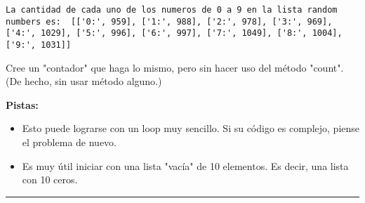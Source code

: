 \documentclass[11pt]{article}
\providecommand{\tightlist}{%
      \setlength{\itemsep}{0pt}\setlength{\parskip}{0pt}}
\begin{document}
    \begin{Verbatim}[commandchars=\\\{\}]
La cantidad de cada uno de los numeros de 0 a 9 en la lista random numbers es:  [['0:', 959], ['1:', 988], ['2:', 978], ['3:', 969], ['4:', 1029], ['5:', 996], ['6:', 997], ['7:', 1049], ['8:', 1004], ['9:', 1031]]

    \end{Verbatim}

    Cree un "contador" que haga lo mismo, pero sin hacer uso del método
"count". (De hecho, sin usar método alguno.)

    \textbf{Pistas:}

\begin{itemize}
\tightlist
\item
  Esto puede lograrse con un loop muy sencillo. Si su código es
  complejo, piense el problema de nuevo.
\item
  Es muy útil iniciar con una lista "vacía" de 10 elementos. Es decir,
  una lista con 10 ceros.
\end{itemize}

    \begin{center}\rule{0.5\linewidth}{\linethickness}\end{center}


    
    
    
    
\end{document}
